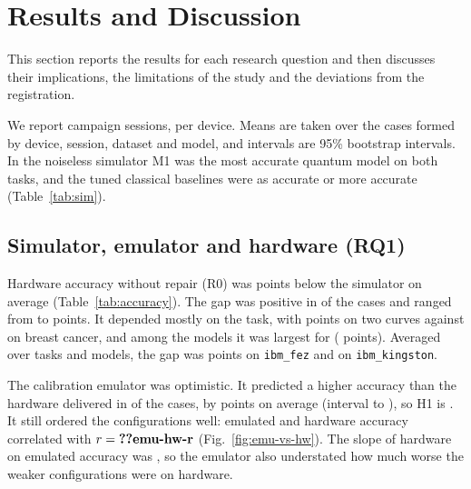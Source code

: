 \section{Results and Discussion}
\label{sec:results}

This section reports the results for each research question and then discusses their
implications, the limitations of the study and the deviations from the registration.

We report  campaign sessions,  per device.
Means are taken over the  cases formed by device, session, dataset and model, and
intervals are 95\% bootstrap intervals. In the noiseless simulator M1 was the most accurate
quantum model on both tasks, and the tuned classical baselines were as accurate or more
accurate (Table~\ref{tab:sim}).

\subsection{Simulator, emulator and hardware (RQ1)}
\label{sec:rq1}
Hardware accuracy without repair (R0) was  points below the simulator on
average (Table~\ref{tab:accuracy}). The gap was positive in  of the
 cases and ranged from  to  points. It depended
mostly on the task, with  points on two curves against
 on breast cancer, %
and among the models it was largest for  ( points).
Averaged over tasks and models, the gap was  points on \texttt{ibm\_fez} and
 on \texttt{ibm\_kingston}.

The calibration emulator was optimistic. %
It predicted a higher accuracy than the hardware delivered in  of the
 cases, by  points on average (interval  to
), so H1 is . It still ordered the configurations well: emulated
and hardware accuracy correlated with $r=\val{emu-hw-r}$ (Fig.~\ref{fig:emu-vs-hw}). %
The slope of hardware on emulated accuracy was , so the emulator also understated
how much worse the weaker configurations were on hardware. %

